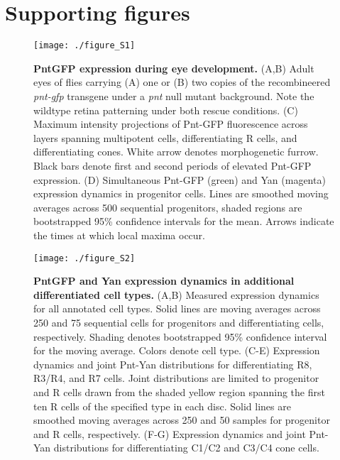 \graphicspath{ {./figures/ratio/} }


\section{Supporting figures}

\begin{figure}[h]
\centering
\texttt{[image: ./figure\_S1]}
\caption[PntGFP expression during eye development.]{\textbf{PntGFP expression during eye development.} (A,B) Adult eyes of flies carrying (A) one or (B) two copies of the recombineered \textit{pnt-gfp} transgene under a \textit{pnt} null mutant background. Note the wildtype retina patterning under both rescue conditions. (C) Maximum intensity projections of Pnt-GFP fluorescence across layers spanning multipotent cells, differentiating R cells, and differentiating cones. White arrow denotes morphogenetic furrow. Black bars denote first and second periods of elevated Pnt-GFP expression. (D) Simultaneous Pnt-GFP (green) and Yan (magenta) expression dynamics in progenitor cells. Lines are smoothed moving averages across 500 sequential progenitors, shaded regions are bootstrapped 95\% confidence intervals for the mean. Arrows indicate the times at which local maxima occur.}
\label{fig:ratio:figS1}
\end{figure}

\begin{figure}[h]
\centering
\texttt{[image: ./figure\_S2]}
\caption[PntGFP and Yan expression dynamics in additional differentiated cell types.]{\textbf{PntGFP and Yan expression dynamics in additional differentiated cell types.} (A,B) Measured expression dynamics for all annotated cell types. Solid lines are moving averages across 250 and 75 sequential cells for progenitors and differentiating cells, respectively. Shading denotes bootstrapped 95\% confidence interval for the moving average. Colors denote cell type. (C-E) Expression dynamics and joint Pnt-Yan distributions for differentiating R8, R3/R4, and R7 cells. Joint distributions are limited to progenitor and R cells drawn from the shaded yellow region spanning the first ten R cells of the specified type in each disc. Solid lines are smoothed moving averages across 250 and 50 samples for progenitor and R cells, respectively. (F-G) Expression dynamics and joint Pnt-Yan distributions for differentiating C1/C2 and C3/C4 cone cells.}
\label{fig:ratio:figS2}
\end{figure}

